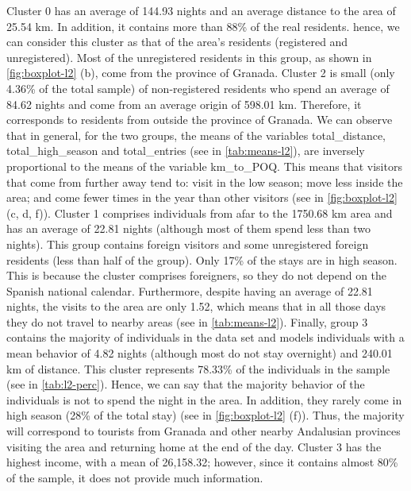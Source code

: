 Cluster 0 has an average of 144.93 nights and an average distance to the area of 25.54 km. In addition, it contains more than 88\% of the real residents. hence, we can consider this cluster as that of the area's residents (registered and unregistered). Most of the unregistered residents in this group, as shown in \cref{fig:boxplot-l2} (b), come from the province of Granada. Cluster 2 is small (only 4.36\% of the total sample) of non-registered residents who spend an average of 84.62 nights and come from an average origin of 598.01 km. Therefore, it corresponds to residents from outside the province of Granada. We can observe that in general, for the two groups, the means of the variables total\_distance, total\_high\_season and total\_entries (see in \cref{tab:means-l2}), are inversely proportional to the means of the variable km\_to\_POQ. This means that visitors that come from further away tend to: visit in the low season; move less inside the area; and come fewer times in the year than other visitors (see in \cref{fig:boxplot-l2} (c, d, f)). Cluster 1 comprises individuals from afar to the 1750.68 km area and has an average of 22.81 nights (although most of them spend less than two nights). This group contains foreign visitors and some unregistered foreign residents (less than half of the group). Only 17\% of the stays are in high season. This is because the cluster comprises foreigners, so they do not depend on the Spanish national calendar. Furthermore, despite having an average of 22.81 nights, the visits to the area are only 1.52, which means that in all those days they do not travel to nearby areas (see in \cref{tab:means-l2}). Finally, group 3 contains the majority of individuals in the data set and models individuals with a mean behavior of 4.82 nights (although most do not stay overnight) and 240.01 km of distance. This cluster represents 78.33\% of the individuals in the sample (see in \cref{tab:l2-perc}). Hence, we can say that the majority behavior of the individuals is not to spend the night in the area. In addition, they rarely come in high season (28\% of the total stay) (see in \cref{fig:boxplot-l2} (f)). Thus, the majority will correspond to tourists from Granada and other nearby Andalusian provinces visiting the area and returning home at the end of the day. Cluster 3 has the highest income, with a mean of 26,158.32; however, since it contains almost 80\% of the sample, it does not provide much information.

